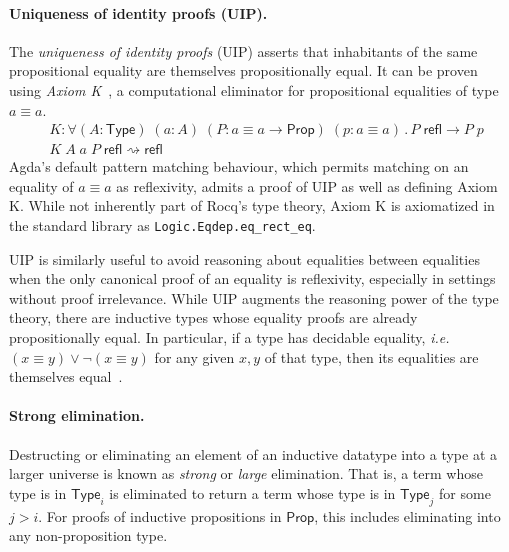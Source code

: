\documentclass{article}
\makeatletter
\newcommand{\ie}{\textit{i.e.}\@\xspace}
\newcommand{\kw}[1]{\mathsf{#1}}
\newcommand{\code}[1]{\texttt{#1}}
\makeatother
\begin{document}
\paragraph{Uniqueness of identity proofs (UIP).}
The \emph{uniqueness of identity proofs} (UIP)
asserts that inhabitants of the same propositional equality
are themselves propositionally equal.
It can be proven using \emph{Axiom K}~\citep{axiomk},
a computational eliminator for propositional equalities of type $a \equiv a$.
%
\begin{align*}
  &K : \forall (A : \kw{Type}) \; (a : A) \; (P : a \equiv a \to \kw{Prop}) \; (p : a \equiv a) \mathpunct{.}
    P \; \kw{refl} \to P \; p \\
  &K \; A \; a \; P \; \kw{refl} \rightsquigarrow \kw{refl}
\end{align*}
%
Agda's default pattern matching behaviour,
which permits matching on an equality of $a \equiv a$ as reflexivity,
admits a proof of UIP as well as defining Axiom K.
While not inherently part of Rocq's type theory,
Axiom K is axiomatized in the standard library as \code{Logic.Eqdep.eq\_rect\_eq}.

UIP is similarly useful to avoid reasoning about equalities between equalities
when the only canonical proof of an equality is reflexivity,
especially in settings without proof irrelevance.
While UIP augments the reasoning power of the type theory,
there are inductive types whose equality proofs are already propositionally equal.
In particular, if a type has decidable equality,
\ie $(x \equiv y) \vee \neg (x \equiv y)$ for any given $x, y$ of that type,
then its equalities are themselves equal~\citep{hedberg}.

\paragraph{Strong elimination.}
Destructing or eliminating an element of an inductive datatype
into a type at a larger universe is known as \emph{strong} or \emph{large} elimination.
That is, a term whose type is in $\kw{Type}_i$
is eliminated to return a term whose type is in $\kw{Type}_j$
for some $j > i$.
For proofs of inductive propositions in $\kw{Prop}$,
this includes eliminating into any non-proposition type.
\end{document}
